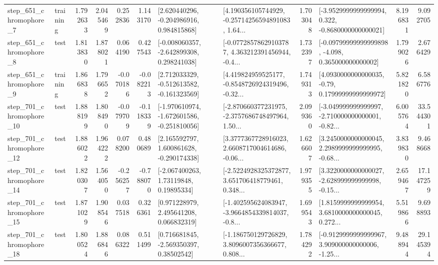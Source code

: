 \begin{tabular}{llrrrrllrlrr}
   step\_651\_chromophore\_7 &  training &      1.792633 &    2.045469 &      0.252836 &  1.143170 &    [2.620440296, -0.204986916, 0.984815868] &  [4.190356105744929, -0.25714256594891083, 1.64... &       1.703048 &  [-3.9529999999999994, 0.322, -0.8680000000000021] &            8.196831 &          9.092705 \\
   step\_651\_chromophore\_8 &      test &      1.813830 &    1.878021 &      0.064190 &  0.427543 &   [-0.008060357, -2.642899308, 0.298241038] &  [-0.07728578629103787, 4.363212391456944, -0.4... &       1.732397 &  [-0.09799999999999898, -4.098, 0.365000000000002] &            1.799026 &          2.676429 \\
   step\_651\_chromophore\_9 &  training &      1.866838 &    1.796652 &     -0.070186 & -0.082213 &   [2.712033329, -0.512613582, -0.161323569] &  [4.419824959525177, -0.8548726924319496, -0.32... &       1.749313 &   [4.0930000000000035, -0.79, 0.17999999999999972] &            5.821820 &          6.586776 \\
  step\_701\_chromophore\_10 &      test &      1.888199 &    1.808490 &     -0.079709 & -0.118339 &  [-1.970610974, -1.672601586, -0.251810056] &  [-2.870660377231975, -2.3757686748497964, 1.50... &       2.099360 &  [-3.049999999999997, -2.710000000000001, -0.82... &            6.005764 &         33.544301 \\
  step\_701\_chromophore\_12 &      test &      1.886022 &    1.964222 &      0.078200 &  0.480689 &    [2.165592797, 1.600861628, -0.290174338] &  [3.3777367728916023, 2.6608717004614686, -0.06... &       1.626607 &  [3.2450000000000045, 2.2989999999999995, -0.68... &            3.839830 &          9.468668 \\
  step\_701\_chromophore\_14 &      test &      1.820307 &    1.564050 &     -0.256257 & -0.788070 &      [-2.067400263, 1.73119848, 0.19895334] &  [-2.5224928325372877, 3.651706418779461, 0.348... &       1.979355 &  [3.3220000000000027, -2.628999999999998, -0.15... &            2.659467 &         17.147259 \\
  step\_701\_chromophore\_15 &      test &      1.871029 &    1.908546 &      0.037518 &  0.326361 &     [0.971228979, 2.495641208, 0.066832319] &  [-1.402595624083947, -3.9664854339814037, -0.8... &       1.699543 &  [1.8159999999999954, 3.6810000000000045, 0.272... &            5.519866 &          9.698893 \\
  step\_701\_chromophore\_18 &      test &      1.800524 &    1.886846 &      0.086322 &  0.511499 &     [0.716681845, -2.569350397, 0.38502542] &  [-1.186750129726829, 3.8096007356366677, 0.808... &       1.784292 &  [-0.9129999999999967, 3.909000000000006, -1.25... &            9.488944 &         29.145394 \\

\end{tabular}
